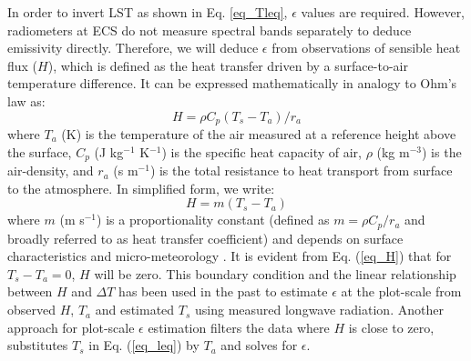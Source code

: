 \documentclass[fleqn,10pt]{wlscirep}
\begin{document}
In order to invert LST as shown in Eq. \eqref{eq_Tleq}, $\epsilon$ values are required. However, radiometers at ECS do not measure spectral bands separately to deduce emissivity directly. Therefore, we will deduce $\epsilon$ from observations of sensible heat flux ($H$), which is defined as the heat transfer driven by a surface-to-air temperature difference. It can be expressed mathematically in analogy to Ohm's law as:
\begin{equation}\label{eq_H1}
H= \rho C_{p}(T_{s} - T_{a})/r_{a}
\end{equation}
where $T_{a}$ (K) is the temperature of the air measured at a reference height above the surface, $C_{p}$ (J kg$^{-1}$ K$^{-1}$) is the specific heat capacity of air, $\rho$ (kg m$^{-3}$) is the air-density, and $r_{a}$ (s m$^{-1}$) is the total resistance to heat transport from surface to the atmosphere. In simplified form, we write:
\begin{equation}\label{eq_H}
H= m(T_{s} - T_{a})
\end{equation}
where $m$ (m s$^{-1}$) is a proportionality constant (defined as $m=\rho C_{p}/r_{a}$ and broadly referred to as heat transfer coefficient) and depends on surface characteristics and micro-meteorology \cite{lhomme_radiative_1988}. It is evident from Eq. (\ref{eq_H}) that for $T_{s} - T_{a} = 0$, $H$ will be zero. This boundary condition and the linear relationship  between $H$ and $\Delta T $ has been used in the past to estimate $\epsilon$ at the plot-scale from observed $H$, $T_a$ and estimated $T_{s}$ using measured longwave radiation\cite{holmes_land_2009,holmes_cloud_2016-1}. Another approach for plot-scale $\epsilon$ estimation filters the data where $H$ is close to zero, substitutes $T_{s}$ in Eq. (\ref{eq_leq}) by $T_{a}$ and solves for $\epsilon$\cite{maes2019potential}. 
\end{document}

